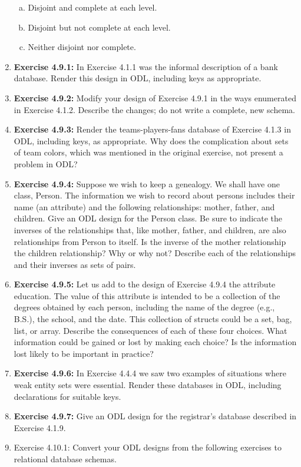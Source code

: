\documentclass[12pt]{article}
\begin{document}
\begin{enumerate}[1.]
    \begin{enumerate}[a)]
        \item Disjoint and complete at each level.
        \item Disjoint but not complete at each level.
        \item Neither disjoint nor complete.
    \end{enumerate}

    \item \textbf{Exercise 4.9.1:} In Exercise 4.1.1 was the informal description of a bank database. Render this design in ODL, including keys as appropriate.
    \item \textbf{Exercise 4.9.2:} Modify your design of Exercise 4.9.1 in the ways enumerated in Exercise 4.1.2. Describe the changes; do not write a complete, new schema.
    \item \textbf{Exercise 4.9.3:} Render the teams-players-fans database of Exercise 4.1.3 in ODL, including keys, as appropriate. Why does the complication about sets of team colors, which was mentioned in the original exercise, not present a problem in ODL?
    \item \textbf{Exercise 4.9.4:} Suppose we wish to keep a genealogy. We shall have one class, Person. The information we wish to record about persons includes their name (an attribute) and the following relationships: mother, father, and children. Give an ODL design for the Person class. Be sure to indicate the inverses of the relationships that, like mother, father, and children, are also relationships from Person to itself. Is the inverse of the mother relationship the children relationship? Why or why not? Describe each of the relationships and their inverses as sets of pairs.
    \item \textbf{Exercise 4.9.5:} Let us add to the design of Exercise 4.9.4 the attribute education. The value of this attribute is intended to be a collection of the degrees obtained by each person, including the name of the degree (e.g., B.S.), the school, and the date. This collection of structs could be a set, bag, list, or array. Describe the consequences of each of these four choices. What information could be gained or lost by making each choice? Is the information lost likely to be important in practice?
    \item \textbf{Exercise 4.9.6:} In Exercise 4.4.4 we saw two examples of situations where weak entity sets were essential. Render these databases in ODL, including declarations for suitable keys.
    \item \textbf{Exercise 4.9.7:} Give an ODL design for the registrar's database described in Exercise 4.1.9.
    \item Exercise 4.10.1: Convert your ODL designs from the following exercises to relational database schemas.


\end{enumerate}
\end{document}

